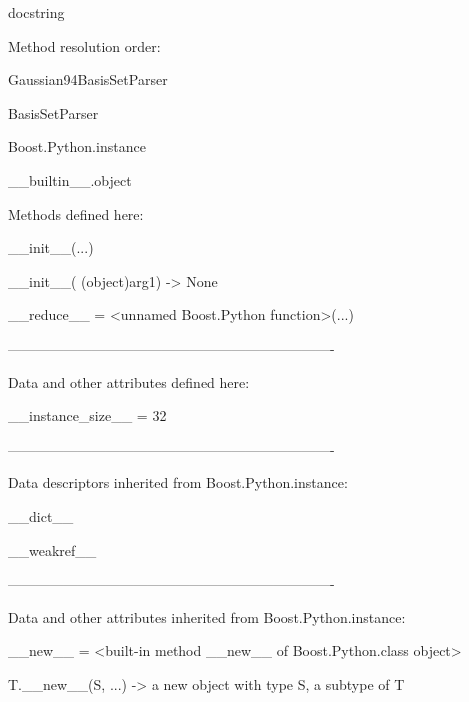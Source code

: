 \documentclass[letterpaper,10pt,english]{sphinxmanual}
\begin{document}
\begin{description}
\begin{description}
\item[{class Gaussian94BasisSetParser(BasisSetParser)}] \leavevmode
\begin{DUlineblock}{0em}
\item[] docstring
\item[] 
\item[] Method resolution order:
\item[]
\begin{DUlineblock}{\DUlineblockindent}
\item[] Gaussian94BasisSetParser
\item[] BasisSetParser
\item[] Boost.Python.instance
\item[] \_\_builtin\_\_.object
\item[] 
\end{DUlineblock}
\item[] Methods defined here:
\item[] 
\item[] \_\_init\_\_(...)
\item[]
\begin{DUlineblock}{\DUlineblockindent}
\item[] \_\_init\_\_( (object)arg1) -\textgreater{} None
\item[] 
\end{DUlineblock}
\item[] \_\_reduce\_\_ = \textless{}unnamed Boost.Python function\textgreater{}(...)
\item[] 
\item[] ----------------------------------------------------------------------
\item[] Data and other attributes defined here:
\item[] 
\item[] \_\_instance\_size\_\_ = 32
\item[] 
\item[] ----------------------------------------------------------------------
\item[] Data descriptors inherited from Boost.Python.instance:
\item[] 
\item[] \_\_dict\_\_
\item[] 
\item[] \_\_weakref\_\_
\item[] 
\item[] ----------------------------------------------------------------------
\item[] Data and other attributes inherited from Boost.Python.instance:
\item[] 
\item[] \_\_new\_\_ = \textless{}built-in method \_\_new\_\_ of Boost.Python.class object\textgreater{}
\item[]
\begin{DUlineblock}{\DUlineblockindent}
\item[] T.\_\_new\_\_(S, ...) -\textgreater{} a new object with type S, a subtype of T
\end{DUlineblock}
\end{DUlineblock}


\end{description}
\end{description}
\end{document}
